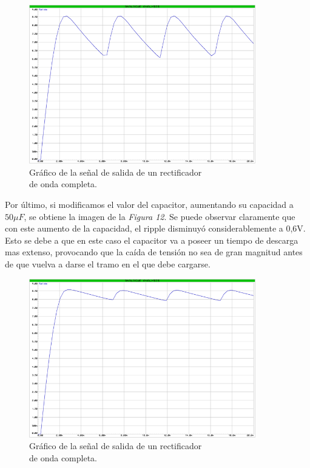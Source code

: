 \documentclass{article}
\begin{document}
\newpage
\begin{figure}[h]
	\centering
	\includegraphics[width=0.88\textwidth]{images/4-4-8-grafico-circuito-rectificador-onda-completa-con-filtro.jpg}
	\medskip
	\caption{Gráfico de la señal de salida de un rectificador\\ de onda completa.}
\end{figure}
\bigskip\bigskip


	Por último, si modificamos el valor del capacitor, aumentando su capacidad a $50\mu F$, se obtiene la imagen de la \textit{Figura 12}. Se puede observar claramente que con este aumento de la capacidad, el ripple disminuyó considerablemente a 0,6V. Esto se debe a que en este caso el capacitor va a poseer un tiempo de descarga mas extenso, provocando que la caída de tensión no sea de gran magnitud antes de que vuelva a darse el tramo en el que debe cargarse. 
\bigskip\bigskip


\newpage
\begin{figure}[h]
	\centering
	\includegraphics[width=0.88\textwidth]{images/4-4-9-grafico-circuito-rectificador-onda-completa-con-filtro-alt.jpg}
	\medskip
	\caption{Gráfico de la señal de salida de un rectificador\\ de onda completa.}
\end{figure}
\bigskip\bigskip
\end{document}
